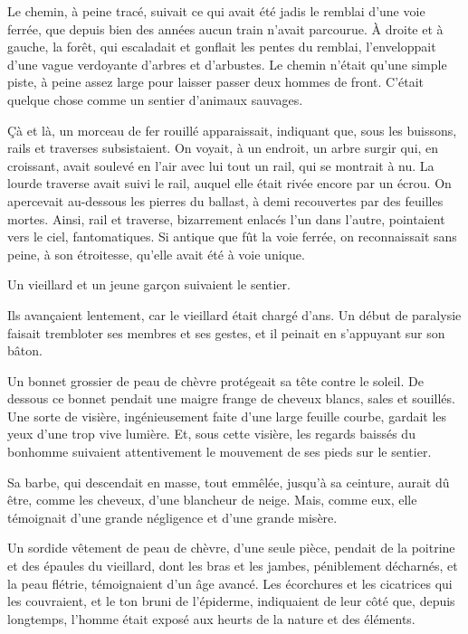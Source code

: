\documentclass[french,twoside]{book} %
\newcommand\chaptercont{} %
\begin{document}
\chaptercont
\noindent Le chemin, à peine tracé, suivait ce qui avait été jadis le remblai d’une voie ferrée, que depuis bien des années aucun train n’avait parcourue. À droite et à gauche, la forêt, qui escaladait et gonflait les pentes du remblai, l’enveloppait d’une vague verdoyante d’arbres et d’arbustes. Le chemin n’était qu’une simple piste, à peine assez large pour laisser passer deux hommes de front. C’était quelque chose comme un sentier d’animaux sauvages.\par
Çà et là, un morceau de fer rouillé apparaissait, indiquant que, sous les buissons, rails et traverses subsistaient. On voyait, à un endroit, un arbre surgir qui, en croissant, avait soulevé en l’air avec lui tout un rail, qui se montrait à nu. La lourde traverse avait suivi le rail, auquel elle était rivée encore par un écrou. On apercevait au-dessous les pierres du ballast, à demi recouvertes par des feuilles mortes. Ainsi, rail et traverse, bizarrement enlacés l’un dans l’autre, pointaient vers le ciel, fantomatiques. Si antique que fût la voie ferrée, on reconnaissait sans peine, à son étroitesse, qu’elle avait été à voie unique.\par
Un vieillard et un jeune garçon suivaient le sentier.\par
Ils avançaient lentement, car le vieillard était chargé d’ans. Un début de paralysie faisait trembloter ses membres et ses gestes, et il peinait en s’appuyant sur son bâton.\par
Un bonnet grossier de peau de chèvre protégeait sa tête contre le soleil. De dessous ce bonnet pendait une maigre frange de cheveux blancs, sales et souillés. Une sorte de visière, ingénieusement faite d’une large feuille courbe, gardait les yeux d’une trop vive lumière. Et, sous cette visière, les regards baissés du bonhomme suivaient attentivement le mouvement de ses pieds sur le sentier.\par
Sa barbe, qui descendait en masse, tout emmêlée, jusqu’à sa ceinture, aurait dû être, comme les cheveux, d’une blancheur de neige. Mais, comme eux, elle témoignait d’une grande négligence et d’une grande misère.\par
Un sordide vêtement de peau de chèvre, d’une seule pièce, pendait de la poitrine et des épaules du vieillard, dont les bras et les jambes, péniblement décharnés, et la peau flétrie, témoignaient d’un âge avancé. Les écorchures et les cicatrices qui les couvraient, et le ton bruni de l’épiderme, indiquaient de leur côté que, depuis longtemps, l’homme était exposé aux heurts de la nature et des éléments.\par
\end{document}
